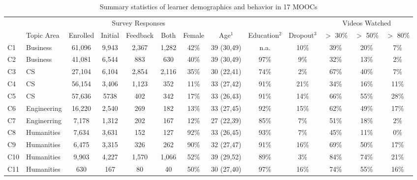 \documentclass{sigchi}\usepackage[]{graphicx}\usepackage[]{color}
\begin{document}
\begin{table}[th]
\label{tab:s1sum}
\caption{Summary statistics of learner demographics and behavior in 17 MOOCs}
\small
\center
\begin{tabular}{llccccccccccc}
\toprule
 &            &          & \multicolumn{3}{c}{Survey Responses} & & & & & \multicolumn{3}{c}{Videos Watched} \\
 \cmidrule(r){4-6} \cmidrule(r){11-13}
 & Topic Area & Enrolled & Initial & Feedback & Both & Female & Age$^1$   & Education$^2$ & Dropout$^3$ & $>$ 30\% & $>$ 50\% & $>$ 80\% \\
\midrule
C1 & Business & 61,096   & 9,943  & 2,367    & 1,282    & 42\%   & 39 (30,49) & n.a.       & 10\% & 39\% & 20\% & 7\% \\
C2 & Business & 41,081   & 6,544  & 883      & 630      & 40\%   & 39 (30,49) & 97\%       & 9\%  & 32\% & 13\% & 2\% \\
C3 & CS       & 27,104   & 6,104 & 2,854     & 2,116    & 35\%   & 30 (22,41) & 74\%       & 2\%  & 67\% & 40\% & 7\% \\
C4 & CS       & 56,154   & 3,406 & 1,123     & 352      & 11\%   & 33 (27,42) & 91\%       & 21\% & 34\% & 16\% & 11\% \\
C5 & CS       & 57,636   & 5738  & 402       & 342      & 17\%   & 33 (26,43) & 91\%       & 14\% & 66\% & 55\% & 28\% \\
C6 & Engineering & 16,220 & 2,540 & 269      & 182      & 13\%   & 33 (27,45) & 92\%       & 15\% & 62\% & 49\% & 17\% \\
C7 & Enginerring & 7,178 & 1,312 & 202       & 167      & 12\%   & 27 (22,39) & 85\%       & 7\%  & 51\% & 18\% & 2\% \\
C8 & Humanities & 7,634 & 3,631  & 152       & 127      & 92\%   & 33 (26,45) & 93\%       & 7\%  & 45\% & 11\% & 0\% \\
C9 & Humanities & 6,475 & 3,315  & 326       & 262      & 90\%   & 32 (27,47) & 91\%       & 16\% & 69\% & 50\% & 17\% \\
C10 & Humanities & 9,903 & 4,227 & 1,570     & 1,066    & 52\%   & 39 (29,52) & 89\%       & 3\%  & 84\% & 74\% & 21\% \\
C11 & Humanities & 630 & 167     & 80        & 40       & 50\%   & 30 (27,40) & 97\%       & 16\% & 74\% & 55\% & 16\% \\

\end{tabular}
\end{table}
\end{document}
